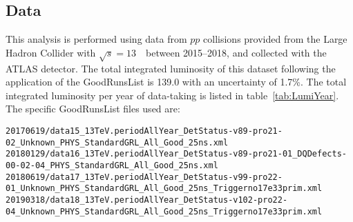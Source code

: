 \subsection{Data}

This analysis is performed using data from $pp$ collisions provided from the Large Hadron Collider with $\sqrt{s} = 13$~\TeV~between 2015--2018, and collected with the ATLAS detector. The total integrated luminosity of this dataset following the application of the GoodRunsList is \SI{139.0}{\ifb} with an uncertainty of 1.7\%. 
The total integrated luminosity per year of data-taking is listed in table~\ref{tab:LumiYear}. The specific GoodRunsList files used are:

\begin{scriptsize}
\begin{verbatim}
20170619/data15_13TeV.periodAllYear_DetStatus-v89-pro21-02_Unknown_PHYS_StandardGRL_All_Good_25ns.xml
20180129/data16_13TeV.periodAllYear_DetStatus-v89-pro21-01_DQDefects-00-02-04_PHYS_StandardGRL_All_Good_25ns.xml
20180619/data17_13TeV.periodAllYear_DetStatus-v99-pro22-01_Unknown_PHYS_StandardGRL_All_Good_25ns_Triggerno17e33prim.xml
20190318/data18_13TeV.periodAllYear_DetStatus-v102-pro22-04_Unknown_PHYS_StandardGRL_All_Good_25ns_Triggerno17e33prim.xml
\end{verbatim}
\end{scriptsize}





